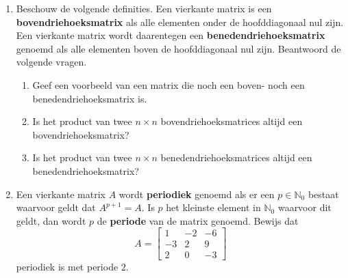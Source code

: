 \begin{enumerate}
\item Beschouw de volgende definities. Een vierkante matrix is een \textbf{bovendriehoeksmatrix} als alle elementen onder de hoofddiagonaal nul zijn. Een vierkante matrix wordt daarentegen een \textbf{benedendriehoeksmatrix} genoemd als alle elementen boven de hoofddiagonaal nul zijn. Beantwoord de volgende vragen.
\begin{enumerate}
	\item Geef een voorbeeld van een matrix die noch een boven- noch een benedendriehoeksmatrix is. 
	\item Is het product van twee $n \times n$ bovendriehoeksmatrices altijd een bovendriehoeksmatrix?
	\item Is het product van twee $n \times n$ benedendriehoeksmatrices altijd een benedendriehoeksmatrix?
\end{enumerate}

%
%	

%
\item
Een vierkante matrix $A$ wordt {\bf periodiek} genoemd als er een $p\in\mathbb{N}_0$ bestaat waarvoor geldt dat $A^{p+1}=A$. Is $p$ het kleinste element in $\mathbb{N}_0$ waarvoor dit geldt, dan wordt $p$ de {\bf periode} van de matrix genoemd. 
Bewijs dat 
\[A=\begin{bmatrix}
 1      &-2     &-6 \\
 -3     &2      &9 \\
 2      &0      &-3
 \end{bmatrix}\]
periodiek is met periode $2$.
 

\end{enumerate}
